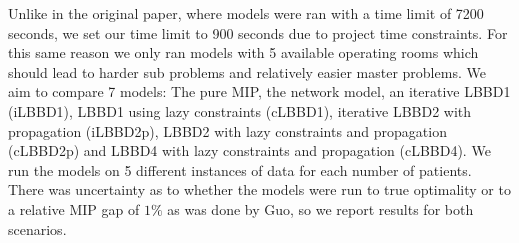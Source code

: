 Unlike in the original paper, where models were ran with a time limit of 7200 seconds, we set our time limit to 900 seconds due to project time constraints. For this same reason we only ran models with 5 available operating rooms which should lead to harder sub problems and relatively easier master problems\cite{roshanaei2017propagating}. We aim to compare 7 models: The pure MIP, the network model, an iterative LBBD1 (iLBBD1), LBBD1 using lazy constraints (cLBBD1), iterative LBBD2 with propagation (iLBBD2p), LBBD2 with lazy constraints and propagation (cLBBD2p) and LBBD4 with lazy constraints and propagation (cLBBD4). We run the models on 5 different instances of data for each number of patients. There was uncertainty as to whether the models were run to true optimality or to a relative MIP gap of $1\%$ as was done by Guo\cite{guo}, so we report results for both scenarios. 